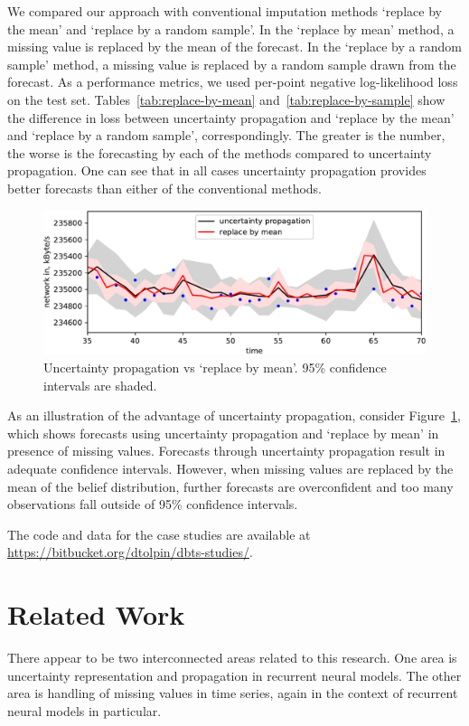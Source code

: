 \documentclass[runningheads]{llncs}
\begin{document}
We compared our approach with conventional imputation methods
`replace by the mean' and `replace by a random sample'.
In the `replace by mean' method, a missing value is replaced 
by the mean of the forecast. In the `replace by a random
sample' method, a missing value is replaced by a random sample
drawn from the forecast. As a performance metrics, we
used per-point negative log-likelihood loss on the test set. 
Tables~\ref{tab:replace-by-mean} and~\ref{tab:replace-by-sample}
show the difference in loss between uncertainty propagation and
`replace by the mean' and `replace by a random sample',
correspondingly. The greater is the number, the worse is the
forecasting by each of the methods compared to uncertainty
propagation.
One can see that in all cases uncertainty propagation provides
better forecasts than either of the conventional methods. 

\begin{figure}[t]
\includegraphics[width=0.9\linewidth]{dist-vs-mean.pdf}
\caption{Uncertainty propagation vs `replace by mean'. 95\% confidence intervals are shaded.}
\label{fig:dist-vs-mean}
\end{figure}
As an illustration of the advantage of uncertainty propagation,
consider Figure~\ref{fig:dist-vs-mean}, which shows forecasts
using uncertainty propagation and `replace by mean' in presence
of missing values. Forecasts through uncertainty propagation
result in adequate confidence intervals. However, when missing
values are replaced by the mean of the belief distribution,
further forecasts are overconfident and too many observations
fall outside of 95\% confidence intervals.

The code and data for the case studies are available at
\url{https://bitbucket.org/dtolpin/dbts-studies/}.

\section{Related Work} 

There appear to be two interconnected areas related to this
research. One area is uncertainty representation and propagation
in recurrent neural models. The other area is handling of
missing values in time series, again in the context of
recurrent neural models in particular. 
\end{document}
